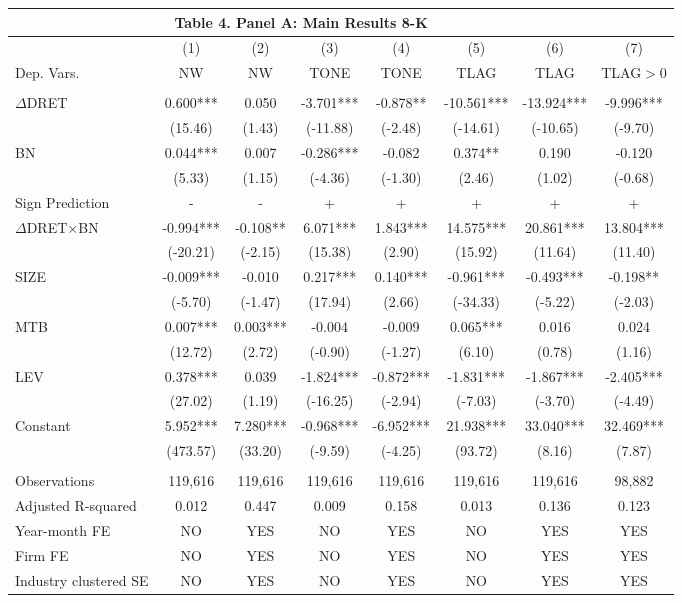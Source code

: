 \begin{table}[htbp] \label{T4PA}
  \centering
    \begin{tabular}{lccccccc}
    \multicolumn{7}{c}{\textbf{Table 4. Panel A: Main Results 8-K}} \\
    \midrule
      & (1) & (2) & (3) & (4) & (5) & (6) & (7)\\
    Dep. Vars. & NW & NW & TONE & TONE & TLAG & TLAG & TLAG$>$0\\
    \midrule
      &   &   &   &   &   &  &  \\
    $\Delta$DRET & 0.600*** & 0.050 & -3.701*** & -0.878** & -10.561*** & -13.924*** & -9.996*** \\
      & (15.46) & (1.43) & (-11.88) & (-2.48) & (-14.61) & (-10.65) & (-9.70) \\
    BN & 0.044*** & 0.007 & -0.286*** & -0.082 & 0.374** & 0.190 & -0.120 \\
      & (5.33) & (1.15) & (-4.36) & (-1.30) & (2.46) & (1.02) & (-0.68) \\
    \rowcolor[rgb]{ .933,  .925,  .882} Sign Prediction & - & - & + & + & + & + & + \\
    \rowcolor[rgb]{ .933,  .925,  .882} $\Delta$DRET$\times$BN & -0.994*** & -0.108** & 6.071*** & 1.843*** & 14.575*** & 20.861*** & 13.804*** \\
    \rowcolor[rgb]{ .933,  .925,  .882}   & (-20.21) & (-2.15) & (15.38) & (2.90) & (15.92) & (11.64) & (11.40) \\
    SIZE & -0.009*** & -0.010 & 0.217*** & 0.140*** & -0.961*** & -0.493*** & -0.198** \\
      & (-5.70) & (-1.47) & (17.94) & (2.66) & (-34.33) & (-5.22) & (-2.03) \\
    MTB & 0.007*** & 0.003*** & -0.004 & -0.009 & 0.065*** & 0.016 & 0.024 \\
      & (12.72) & (2.72) & (-0.90) & (-1.27) & (6.10) & (0.78) & (1.16) \\
    LEV & 0.378*** & 0.039 & -1.824*** & -0.872*** & -1.831*** & -1.867*** & -2.405*** \\
      & (27.02) & (1.19) & (-16.25) & (-2.94) & (-7.03) & (-3.70) & (-4.49) \\
    Constant & 5.952*** & 7.280*** & -0.968*** & -6.952*** & 21.938*** & 33.040*** & 32.469*** \\
      & (473.57) & (33.20) & (-9.59) & (-4.25) & (93.72) & (8.16) & (7.87) \\
      &   &   &   &   &   &  &  \\
    Observations & 119,616 & 119,616 & 119,616 & 119,616 & 119,616 & 119,616 & 98,882 \\
    Adjusted R-squared & 0.012 & 0.447 & 0.009 & 0.158 & 0.013 & 0.136 & 0.123 \\
    Year-month FE & NO & YES & NO & YES & NO & YES & YES \\
    Firm FE & NO & YES & NO & YES & NO & YES & YES \\
    Industry clustered SE & NO & YES & NO & YES & NO & YES & YES \\
    \bottomrule
    \end{tabular}%
\end{table}%

